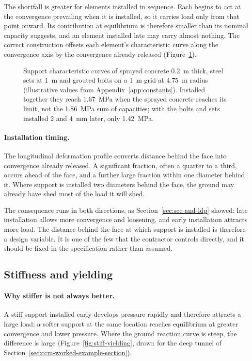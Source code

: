 The shortfall is greater for elements installed in sequence. Each begins to act at the
convergence prevailing when it is installed, so it carries load only from that
point onward. Its contribution at equilibrium is therefore smaller than its
nominal capacity suggests, and an element installed late may carry almost
nothing. The correct construction offsets each element's characteristic curve
along the convergence axis by the convergence already released
(Figure~\ref{fig:combined-support}).

\begin{figure}[htbp]
\centering
{}
\caption{Support characteristic curves of sprayed concrete 0.2~m thick, steel sets at 1~m and grouted bolts on a 1~m grid at 4.75~m radius (illustrative values from Appendix~\ref{app:constants}). Installed together they reach 1.67~MPa when the sprayed concrete reaches its limit, not the 1.86~MPa sum of capacities; with the bolts and sets installed 2 and 4~mm later, only 1.42~MPa.}
\label{fig:combined-support}
\end{figure}

\paragraph{Installation timing.}
The longitudinal deformation profile converts distance behind the face into
convergence already released. A significant fraction, often a quarter to a
third, occurs ahead of the face, and a further large fraction within one
diameter behind it. Where support is installed two diameters behind the face, the
ground may already have shed most of the load it will shed.

The consequence runs in both directions, as Section~\ref{sec:scc-and-ldp}
showed: late installation allows more convergence and loosening, and early
installation attracts more load. The distance behind the face at which support
is installed is therefore a design variable. It is one of
the few that the contractor controls directly, and it should be fixed in
the specification rather than assumed.

\subsection{Stiffness and yielding}
\label{sec:stiffness-and-yielding}

\paragraph{Why stiffer is not always better.}
A stiff support installed early develops pressure rapidly and therefore
attracts a large load; a softer support at the same location reaches
equilibrium at greater convergence and lower pressure. Where the ground
reaction curve is steep, the difference is large
(Figure~\ref{fig:stiff-yielding}, drawn for the deep tunnel of
Section~\ref{sec:ccm-worked-example-section}).

